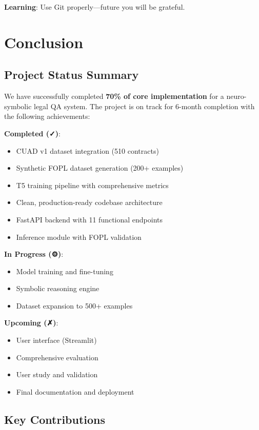 \documentclass[12pt,a4paper]{article}
\begin{document}
\textbf{Learning}: Use Git properly—future you will be grateful.

\newpage

\section{Conclusion}

\subsection{Project Status Summary}

We have successfully completed \textbf{70\% of core implementation} for a neuro-symbolic legal QA system. The project is on track for 6-month completion with the following achievements:

\textbf{Completed (✓)}:
\begin{itemize}
    \item CUAD v1 dataset integration (510 contracts)
    \item Synthetic FOPL dataset generation (200+ examples)
    \item T5 training pipeline with comprehensive metrics
    \item Clean, production-ready codebase architecture
    \item FastAPI backend with 11 functional endpoints
    \item Inference module with FOPL validation
\end{itemize}

\textbf{In Progress (⚙)}:
\begin{itemize}
    \item Model training and fine-tuning
    \item Symbolic reasoning engine
    \item Dataset expansion to 500+ examples
\end{itemize}

\textbf{Upcoming (✗)}:
\begin{itemize}
    \item User interface (Streamlit)
    \item Comprehensive evaluation
    \item User study and validation
    \item Final documentation and deployment
\end{itemize}

\subsection{Key Contributions}
\end{document}
